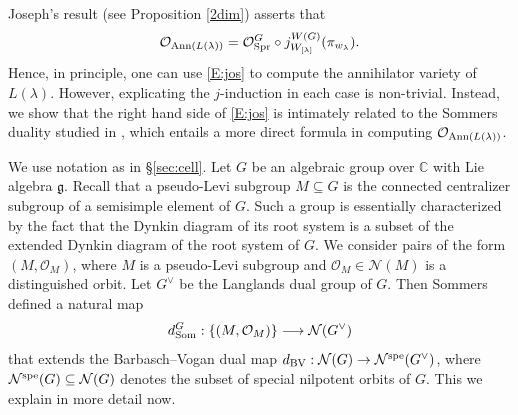 \documentclass[reqno,12pt]{amsart}
\numberwithin{equation}{section}
\theoremstyle{plain}
\theoremstyle{definition}
\renewcommand{\subset}{\subseteq}
\begin{document}
Joseph's result (see Proposition \ref{2dim}) asserts that
\begin{equation} \label{E:jos}
\mathcal{O}_{{\rm Ann}(L(\lambda))} = \mathcal{O}_{\rm Spr}^G \circ j_{W_{[\lambda]}}^{W(G)} (\pi_{w_\lambda}).
\end{equation}
Hence, in principle, one can use \eqref{E:jos} to compute the annihilator variety of $L(\lambda)$. However, explicating the $j$-induction in each case is non-trivial. Instead, we show that the right hand side of \eqref{E:jos} is intimately related to the Sommers duality studied in \cite{Sommers}, which entails a more direct formula in computing $\mathcal{O}_{{\rm Ann}(L(\lambda))}$.

We use notation as in \S \ref{sec:cell}. Let $G$ be an algebraic group over $\mathbb{C}$ with Lie algebra $\mathfrak{g}$. Recall that a pseudo-Levi subgroup $M \subseteq G$ is the connected  centralizer subgroup of a semisimple element of $G$. Such a group is essentially characterized by the fact that the Dynkin diagram of its root system is a subset of the extended Dynkin diagram of the root system of $G$. We consider pairs of the form $(M, \mathcal{O}_M)$, where $M$ is a pseudo-Levi subgroup and $\mathcal{O}_M \in \mathcal{N}(M)$ is a distinguished orbit. Let $G^\vee$ be the Langlands dual group of $G$. Then Sommers defined a natural map
$$d_{\rm Som}^G: \{(M, \mathcal{O}_M) \} \longrightarrow \mathcal{N}(G^\vee)$$
that extends the Barbasch--Vogan dual map $d_{\rm BV}: \mathcal{N}(G) \to \mathcal{N}^{\rm spe}(G^\vee)$, where $\mathcal{N}^{\rm spe}(G) \subset \mathcal{N}(G)$ denotes the subset of special nilpotent orbits of $G$. This we explain in more detail now.
\end{document}
